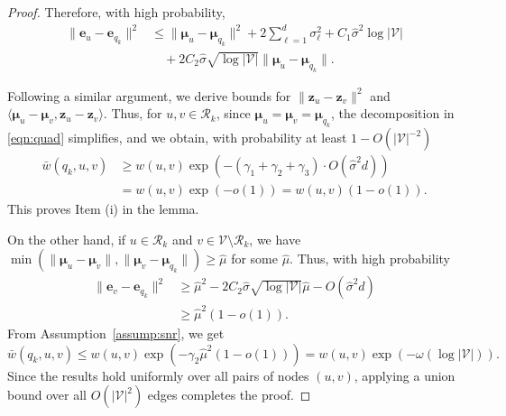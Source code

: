 \documentclass{article} %
\begin{document}
\begin{proof}
Therefore, with high probability,
\begin{align*}
    \|\mathbf{e}_u - \mathbf{e}_{q_k}\|^2
    &\leq \|\boldsymbol{\mu}_u - \boldsymbol{\mu}_{q_k}\|^2
    + 2 \sum_{\ell=1}^d \sigma_\ell^2
    + C_1 \hat{\sigma}^2 \log |\mathcal{V}| \\
    &\quad + 2 C_2 \hat{\sigma} \sqrt{\log |\mathcal{V}|} \|\boldsymbol{\mu}_u - \boldsymbol{\mu}_{q_k}\|.
\end{align*}

Following a similar argument, we derive bounds for $\|\mathbf{z}_u - \mathbf{z}_v\|^2$ and $\langle \boldsymbol{\mu}_u - \boldsymbol{\mu}_v, \mathbf{z}_u - \mathbf{z}_v\rangle$. Thus, for $u, v \in \mathcal{R}_k$, since $\boldsymbol{\mu}_u = \boldsymbol{\mu}_v = \boldsymbol{\mu}_{q_k}$, the decomposition in \eqref{eqn:quad} simplifies, and we obtain, with probability at least $1 - O(|\mathcal{V}|^{-2})$
\begin{align*}
    \bar{w}(q_k, u, v) &\geq w(u, v)\exp\left(- (\gamma_1 + \gamma_2 + \gamma_3) \cdot O(\hat{\sigma}^2 d)\right) \\
    &= w(u, v)\exp(-o(1)) = w(u, v)(1-o(1)).
\end{align*}
This proves Item (i) in the lemma. 

On the other hand, if $u \in \mathcal{R}_k$ and $v \in \mathcal{V} \setminus \mathcal{R}_k$, we have $\min (\|\boldsymbol{\mu}_u - \boldsymbol{\mu}_{v}\|, \|\boldsymbol{\mu}_v - \boldsymbol{\mu}_{q_k}\|) \geq \hat{\mu}$ for some $\hat{\mu}$. Thus, with high probability 
\begin{align*}
    \|\mathbf{e}_v - \mathbf{e}_{q_k}\|^2 &\geq \hat{\mu}^2 - 2C_2\hat{\sigma}\sqrt{\log |\mathcal{V}|}\hat{\mu} - O(\hat{\sigma}^2 d) \\
    &\geq \hat{\mu}^2(1 - o(1)).
\end{align*}
From Assumption~\ref{assump:snr}, we get 
\begin{equation*}
    \bar{w}(q_k, u, v) \leq w(u, v)\exp(-\gamma_2 \hat{\mu}^2(1 - o(1))) = w(u, v)\exp(-\omega(\log |\mathcal{V}|)).
\end{equation*}
Since the results hold uniformly over all pairs of nodes $(u,v)$, applying a union bound over all $O(|\mathcal{V}|^2)$ edges completes the proof.
\end{proof}



\end{document}
